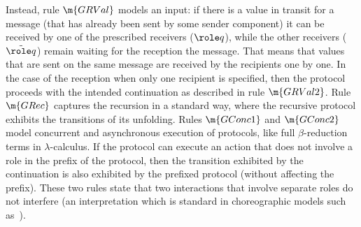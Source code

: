 \begin{itemize}
Instead, rule $\m{GRVal}$ models an input: if there is a value in transit for a message (that has already been sent by some sender component) it can be received by one of the prescribed receivers ($\role q$), while the other receivers ($\tilde{\role q}$) remain waiting for the reception the message. That means that values that are sent on the same message are received by the recipients one by one. In the case of the reception when only one recipient is specified, then the
protocol proceeds with the intended continuation as described in rule $\m{GRVal2}$. Rule $\m{GRec}$ captures the recursion in a standard way, where the recursive protocol exhibits the transitions of its
unfolding. Rules $\m{GConc1}$ and $\m{GConc2}$ model concurrent and asynchronous execution of protocols, like  full $\beta$-reduction terms in $\lambda$-calculus. If the protocol can execute an action that does not involve a role in the prefix of the protocol, then the transition exhibited by the continuation is also exhibited by the prefixed protocol (without affecting the prefix). These two rules state that two interactions that involve separate roles do not interfere (an interpretation which is standard in choreographic models such as~\cite{fabrizio}).
 









\end{itemize}








